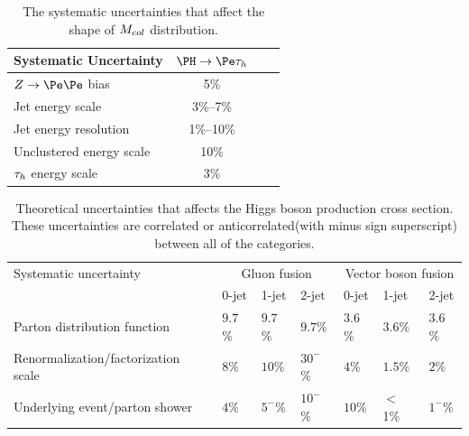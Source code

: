 \begin{table}[hbtp]
 \centering
 \caption{The systematic uncertainties that affect the shape of $M_{col}$ distribution. }
  \label{tab:shape_systematics}
  \begin{tabular}{lclc} \hline
Systematic Uncertainty                                 &   $\PH \to \Pe \tauh$                   \\ \hline
$Z \to \Pe\Pe$ bias                                       &   5\%                                         \\
Jet energy scale                                           &    3\%--7\%                                       \\
Jet energy resolution                                    &    1\%--10\%                                       \\
Unclustered energy scale                             &    10\%                                       \\
$\tau_{h}$ energy scale                                    &    3\%                                         \\    \hline
  \end{tabular}
\end{table}



\begin{table}[hbtp]
 \centering
 \caption{Theoretical uncertainties that affects the Higgs boson production cross section. These uncertainties are correlated or anticorrelated(with minus sign superscript) between all of the categories.}
  \label{tab:theory_systematics}
  \begin{tabular}{l|l|l|l|l|l|l} \hline
Systematic uncertainty                  &  \multicolumn{3}{c|}{Gluon fusion} &  \multicolumn{3}{c}{Vector boson fusion}  \\ \cline{2-7}
                                &    0-jet  & 1-jet  & 2-jet   & 0-jet & 1-jet  & 2-jet  \\ \hline
Parton distribution function         &    $9.7$\%  &  $9.7$\% &   $9.7$\% & $3.6$\%  &   $3.6$\%  &  $3.6$\%  \\
Renormalization/factorization scale           &    $8$\%    &  $10$\%   &  $30^{-}$\%   & $4$\%     &   $1.5$\%  & $2$\%   \\
Underlying event/parton shower  &   $4$\%     & $5^{-}$\%   &  $10^{-}$\%   & $10$\%    &   $<$1\%    & $1^{-}$\%   \\ \hline
  \end{tabular}
\end{table}


       




